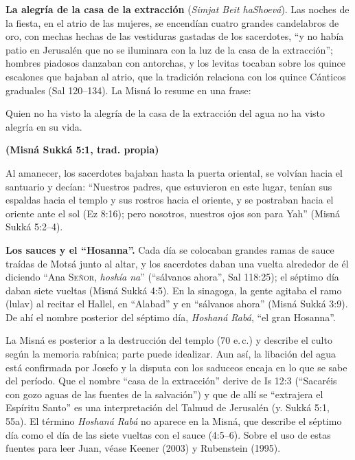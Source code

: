 \documentclass[11pt,letterpaper]{article}
\newcommand{\SENOR}{\textsc{Señor}}
\newcommand{\fuente}[1]{\par\hfill{\upshape\bfseries\small\textcolor{tierraroja}{#1}}}
\begin{document}
\textbf{La alegría de la casa de la extracción} (\emph{Simjat Beit haShoevá}). Las noches de la fiesta, en el atrio de las mujeres, se encendían cuatro grandes candelabros de oro, con mechas hechas de las vestiduras gastadas de los sacerdotes, ``y no había patio en Jerusalén que no se iluminara con la luz de la casa de la extracción''; hombres piadosos danzaban con antorchas, y los levitas tocaban sobre los quince escalones que bajaban al atrio, que la tradición relaciona con los quince Cánticos graduales (Sal 120--134). La Misná lo resume en una frase:

\begin{cita}Quien no ha visto la alegría de la casa de la extracción del agua no ha visto alegría en su vida.\fuente{(Misná Sukká 5:1, trad. propia)}\end{cita}

Al amanecer, los sacerdotes bajaban hasta la puerta oriental, se volvían hacia el santuario y decían: ``Nuestros padres, que estuvieron en este lugar, tenían sus espaldas hacia el templo y sus rostros hacia el oriente, y se postraban hacia el oriente ante el sol (Ez 8:16); pero nosotros, nuestros ojos son para Yah'' (Misná Sukká 5:2--4).

\textbf{Los sauces y el ``Hosanna''.} Cada día se colocaban grandes ramas de sauce traídas de Motsá junto al altar, y los sacerdotes daban una vuelta alrededor de él diciendo ``Ana \SENOR, \emph{hoshía na}'' (``sálvanos ahora'', Sal 118:25); el séptimo día daban siete vueltas (Misná Sukká 4:5). En la sinagoga, la gente agitaba el ramo (lulav) al recitar el Hallel, en ``Alabad'' y en ``sálvanos ahora'' (Misná Sukká 3:9). De ahí el nombre posterior del séptimo día, \emph{Hoshaná Rabá}, ``el gran Hosanna''.

\begin{nota}[Precisión]
La Misná es posterior a la destrucción del templo (70 e.\,c.) y describe el culto según la memoria rabínica; parte puede idealizar. Aun así, la libación del agua está confirmada por Josefo y la disputa con los saduceos encaja en lo que se sabe del período. Que el nombre ``casa de la extracción'' derive de Is 12:3 (``Sacaréis con gozo aguas de las fuentes de la salvación'') y que de allí se ``extrajera el Espíritu Santo'' es una interpretación del Talmud de Jerusalén (y. Sukká 5:1, 55a). El término \emph{Hoshaná Rabá} no aparece en la Misná, que describe el séptimo día como el día de las siete vueltas con el sauce (4:5--6). Sobre el uso de estas fuentes para leer Juan, véase Keener (2003) y Rubenstein (1995).
\end{nota}
\end{document}
